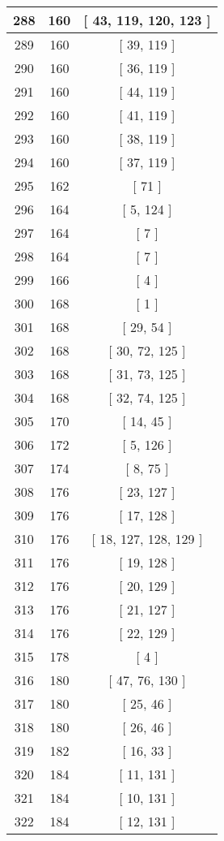 \begin{center}
\begin{longtable}[H]{|| c c c ||}
\hline
288 & 160 & [ 43, 119, 120, 123 ] \\ 
\hline
289 & 160 & [ 39, 119 ] \\ 
\hline
290 & 160 & [ 36, 119 ] \\ 
\hline
291 & 160 & [ 44, 119 ] \\ 
\hline
292 & 160 & [ 41, 119 ] \\ 
\hline
293 & 160 & [ 38, 119 ] \\ 
\hline
294 & 160 & [ 37, 119 ] \\ 
\hline
295 & 162 & [ 71 ] \\ 
\hline
296 & 164 & [ 5, 124 ] \\ 
\hline
297 & 164 & [ 7 ] \\ 
\hline
298 & 164 & [ 7 ] \\ 
\hline
299 & 166 & [ 4 ] \\ 
\hline
300 & 168 & [ 1 ] \\ 
\hline
301 & 168 & [ 29, 54 ] \\ 
\hline
302 & 168 & [ 30, 72, 125 ] \\ 
\hline
303 & 168 & [ 31, 73, 125 ] \\ 
\hline
304 & 168 & [ 32, 74, 125 ] \\ 
\hline
305 & 170 & [ 14, 45 ] \\ 
\hline
306 & 172 & [ 5, 126 ] \\ 
\hline
307 & 174 & [ 8, 75 ] \\ 
\hline
308 & 176 & [ 23, 127 ] \\ 
\hline
309 & 176 & [ 17, 128 ] \\ 
\hline
310 & 176 & [ 18, 127, 128, 129 ] \\ 
\hline
311 & 176 & [ 19, 128 ] \\ 
\hline
312 & 176 & [ 20, 129 ] \\ 
\hline
313 & 176 & [ 21, 127 ] \\ 
\hline
314 & 176 & [ 22, 129 ] \\ 
\hline
315 & 178 & [ 4 ] \\ 
\hline
316 & 180 & [ 47, 76, 130 ] \\ 
\hline
317 & 180 & [ 25, 46 ] \\ 
\hline
318 & 180 & [ 26, 46 ] \\ 
\hline
319 & 182 & [ 16, 33 ] \\ 
\hline
320 & 184 & [ 11, 131 ] \\ 
\hline
321 & 184 & [ 10, 131 ] \\ 
\hline
322 & 184 & [ 12, 131 ] \\ 

\end{longtable}
\end{center}
